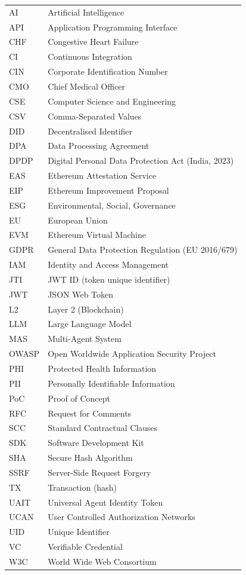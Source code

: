 \documentclass[12pt]{report}
\begin{document}
\noindent\footnotesize
\renewcommand{\arraystretch}{1.0}
\begin{tabular}{@{}lp{12cm}@{}}
AI    & Artificial Intelligence \\
API   & Application Programming Interface \\
CHF   & Congestive Heart Failure \\
CI    & Continuous Integration \\
CIN   & Corporate Identification Number \\
CMO   & Chief Medical Officer \\
CSE   & Computer Science and Engineering \\
CSV   & Comma-Separated Values \\
DID   & Decentralised Identifier \\
DPA   & Data Processing Agreement \\
DPDP  & Digital Personal Data Protection Act (India, 2023) \\
EAS   & Ethereum Attestation Service \\
EIP   & Ethereum Improvement Proposal \\
ESG   & Environmental, Social, Governance \\
EU    & European Union \\
EVM   & Ethereum Virtual Machine \\
GDPR  & General Data Protection Regulation (EU 2016/679) \\
IAM   & Identity and Access Management \\
JTI   & JWT ID (token unique identifier) \\
JWT   & JSON Web Token \\
L2    & Layer 2 (Blockchain) \\
LLM   & Large Language Model \\
MAS   & Multi-Agent System \\
OWASP & Open Worldwide Application Security Project \\
PHI   & Protected Health Information \\
PII   & Personally Identifiable Information \\
PoC   & Proof of Concept \\
RFC   & Request for Comments \\
SCC   & Standard Contractual Clauses \\
SDK   & Software Development Kit \\
SHA   & Secure Hash Algorithm \\
SSRF  & Server-Side Request Forgery \\
TX    & Transaction (hash) \\
UAIT  & Universal Agent Identity Token \\
UCAN  & User Controlled Authorization Networks \\
UID   & Unique Identifier \\
VC    & Verifiable Credential \\
W3C   & World Wide Web Consortium \\
\end{tabular}
\renewcommand{\arraystretch}{1}
\normalsize

\clearpage
{}
\setcounter{page}{1}







\end{document}
